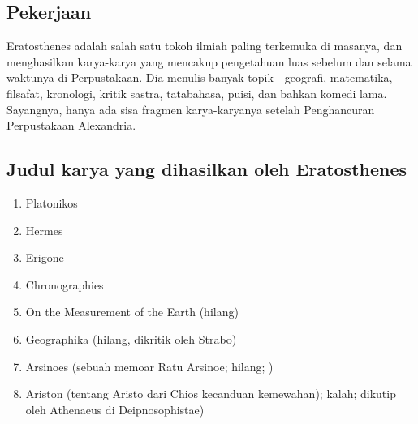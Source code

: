 \subsection{Pekerjaan}
Eratosthenes adalah salah satu tokoh ilmiah paling terkemuka di masanya, dan menghasilkan karya-karya yang mencakup pengetahuan luas sebelum dan selama waktunya di Perpustakaan. Dia menulis banyak topik - geografi, matematika, filsafat, kronologi, kritik sastra, tatabahasa, puisi, dan bahkan komedi lama. Sayangnya, hanya ada sisa fragmen karya-karyanya setelah Penghancuran Perpustakaan Alexandria.

\subsection{Judul karya yang dihasilkan oleh Eratosthenes}
\begin{enumerate}
\item	Platonikos
\item	Hermes
\item	Erigone
\item	Chronographies
\item	On the Measurement of the Earth (hilang)
\item	Geographika (hilang, dikritik oleh Strabo)
\item	Arsinoes (sebuah memoar Ratu Arsinoe; hilang; \cite{gulickathenaeus})
\item	Ariston (tentang Aristo dari Chios kecanduan kemewahan); kalah; dikutip oleh Athenaeus di Deipnosophistae) \cite{gulickathenaeus}
\end{enumerate}
